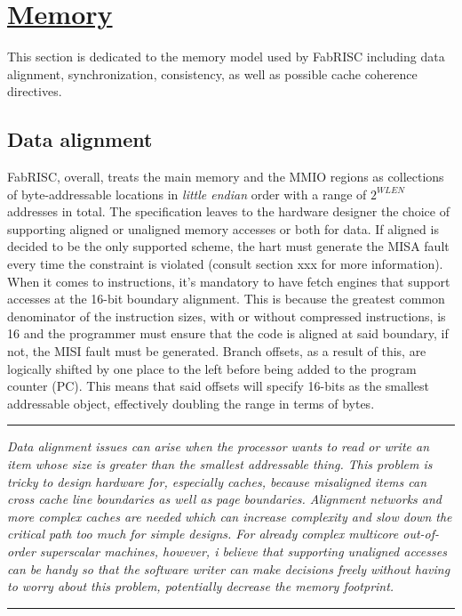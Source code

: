 \section[Memory]{\LARGE\underline{Memory}}

    \vspace{10pt}

    This section is dedicated to the memory model used by FabRISC including data alignment, synchronization, consistency, as well as possible cache coherence directives.

    \subsection[Data alignment]{Data alignment}

        \vspace{10pt}

        FabRISC, overall, treats the main memory and the MMIO regions as collections of byte-addressable locations in \textit{little endian} order with a range of \(2^{WLEN}\) addresses in total. The specification leaves to the hardware designer the choice of supporting aligned or unaligned memory accesses or both for data. If aligned is decided to be the only supported scheme, the hart must generate the MISA fault every time the constraint is violated (consult section xxx for more information). When it comes to instructions, it's mandatory to have fetch engines that support accesses at the 16-bit boundary alignment. This is because the greatest common denominator of the instruction sizes, with or without compressed instructions, is 16 and the programmer must ensure that the code is aligned at said boundary, if not, the MISI fault must be generated. Branch offsets, as a result of this, are logically shifted by one place to the left before being added to the program counter (PC). This means that said offsets will specify 16-bits as the smallest addressable object, effectively doubling the range in terms of bytes.

    \par\noindent\rule{\textwidth}{0.4pt}
    \textit{Data alignment issues can arise when the processor wants to read or write an item whose size is greater than the smallest addressable thing. This problem is tricky to design hardware for, especially caches, because misaligned items can cross cache line boundaries as well as page boundaries. Alignment networks and more complex caches are needed which can increase complexity and slow down the critical path too much for simple designs. For already complex multicore out-of-order superscalar machines, however, i believe that supporting unaligned accesses can be handy so that the software writer can make decisions freely without having to worry about this problem, potentially decrease the memory footprint.}
    \par\noindent\rule{\textwidth}{0.4pt}

